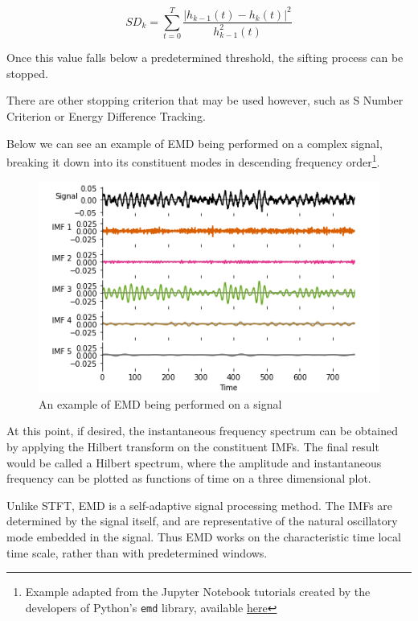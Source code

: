 \documentclass[
  english,
  paper=a4,
  oneside  ,captions=tableheading
]{scrbook}
\newcommand{\passthrough}[1]{#1}
\begin{document}
\begin{equation}
SD_{k}=\sum _{{t=0}}^{{T}}{\frac  {|h_{{k-1}}(t)-h_{k}(t)|^{2}}{h_{{k-1}}^{2}(t)}}
\end{equation}

Once this value falls below a predetermined threshold, the sifting
process can be stopped.

There are other stopping criterion that may be used however, such as S
Number Criterion or Energy Difference Tracking.

Below we can see an example of EMD being performed on a complex signal,
breaking it down into its constituent modes in descending frequency
order\footnote{Example adapted from the Jupyter Notebook tutorials
  created by the developers of Python's \passthrough{\lstinline!emd!}
  library, available
  \href{https://emd.readthedocs.io/en/stable/_downloads/e47aacca40568b7bb056bd96535966c4/emd_tutorials_jupyter.zip}{here}}.

\begin{figure}
\centering
\includegraphics{img/emd_example.png}
\caption{An example of EMD being performed on a signal}
\end{figure}

At this point, if desired, the instantaneous frequency spectrum can be
obtained by applying the Hilbert transform on the constituent IMFs. The
final result would be called a Hilbert spectrum, where the amplitude and
instantaneous frequency can be plotted as functions of time on a three
dimensional plot.

Unlike STFT, EMD is a self-adaptive signal processing method. The IMFs
are determined by the signal itself, and are representative of the
natural oscillatory mode embedded in the signal. Thus EMD works on the
characteristic time local time scale, rather than with predetermined
windows.
\end{document}
